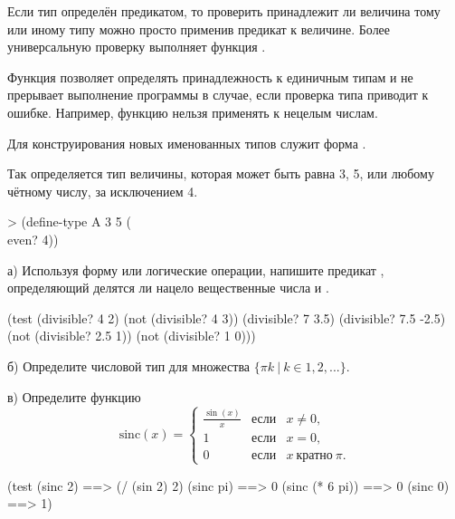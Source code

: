 Если тип определён предикатом, то проверить принадлежит ли величина тому или иному типу можно просто применив предикат к величине. Более универсальную проверку выполняет функция .

\begin{example}{%
Функция  позволяет определять принадлежность к единичным типам и не прерывает выполнение программы в случае, если проверка типа приводит к ошибке. Например, функцию  нельзя применять к нецелым числам.}
\end{example}

Для конструирования новых именованных типов служит форма .

\begin{example}{%
Так определяется тип величины, которая может быть равна 3, 5, или любому чётному числу, за исключением 4.}
\begin{ExampleCode}
> (define-type A
    3 5 (\\ even? 4))
\end{ExampleCode}
\end{example}


\begin{Assignment}
а) Используя форму  или логические операции, напишите предикат , определяющий делятся ли нацело вещественные числа  и . 

\begin{Specification}
(test
  (divisible? 4 2)
  (not (divisible? 4 3))
  (divisible? 7 3.5)
  (divisible? 7.5 -2.5)
  (not (divisible? 2.5 1))
  (not (divisible? 1 0)))
\end{Specification}

б) Определите числовой тип для множества $\{\pi k\ |\ k \in 1,2, ...\}$.

в) Определите функцию 
\begin{equation*}
\mathrm{sinc}(x) = \left\{
\begin{array}{lll}
  \frac{\sin(x)}{x} &\text{если}& x \neq 0,\\
  1 &\text{если}& x = 0,\\
  0 &\text{если}& x~\text{кратно}~\pi.
\end{array}\right. 
\end{equation*}
 
\begin{Specification}
(test
  (sinc 2)        ==> (/ (sin 2) 2)
  (sinc pi)       ==> 0
  (sinc (* 6 pi)) ==> 0
  (sinc 0)        ==> 1)
\end{Specification}
\end{Assignment}




